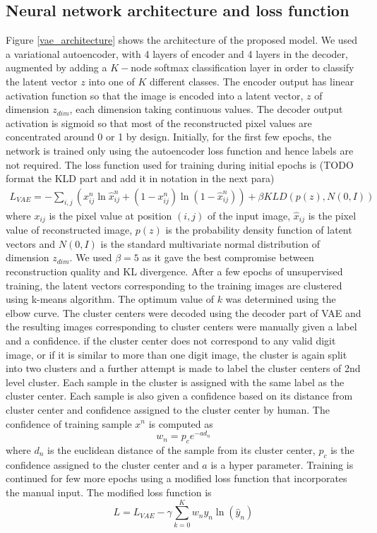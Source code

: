 \documentclass{uai2021} %
\begin{document}
\subsection{Neural network architecture and loss function}
Figure \ref{vae_architecture} shows the architecture of the proposed model.
We used a variational autoencoder\cite{kingma2013auto}, with 4 layers of encoder and 4 layers in the decoder, augmented by adding a $K-$node softmax classification layer in order to classify the latent vector $z$ into one of $K$ different classes.
The encoder output has linear activation function so that the image is encoded into a latent vector, $z$  of dimension $z_{dim}$, each dimension taking continuous values.
The decoder output activation is sigmoid so that most of the reconstructed pixel values  are concentrated around 0 or 1 by design.
Initially, for the first few epochs, the network is trained only using the autoencoder loss function and hence labels are not required.
The loss function used for training during initial epochs is (TODO format the KLD part and add it in notation in the next para)
\begin{multline}
L_{VAE} = -\sum_{i, j}(x_{ij}^n \ln \hat{x}_{ij}^n + (1 - x_{ij}^n) \ln(1 -  \hat{x}_{ij}^n ) )
    +\beta KLD(p(z), N(0,I))
\end{multline}
where   $x_{ij}$ is the pixel value at position $(i, j)$ of the input image, $\hat{x}_{ij}$ is the pixel value of reconstructed image, $p(z)$ is the probability density function of latent vectors and $N(0,I)$ is the standard multivariate normal distribution of dimension $z_{dim}$.
We used $\beta = 5$ as it gave the best compromise between reconstruction quality and KL divergence.
After a few epochs of unsupervised training, the latent vectors corresponding to the training images are clustered using k-means algorithm.
The optimum value of $k$ was determined using the elbow curve. The cluster centers were decoded using the decoder part of VAE and the resulting images corresponding to cluster centers were manually given a label and a confidence.
if the cluster center does not correspond to any valid digit image, or if it is similar to more than one digit image, the cluster is again split into two clusters and a further attempt is made to label the cluster centers of 2nd level cluster.
Each sample in the cluster is assigned with the  same label as the cluster center. Each sample is also given a confidence based on its distance from cluster center and  confidence assigned to the cluster center by human.
The confidence of  training sample $x^n$ is computed as
\begin{equation}
w_n = p_ce^{-a d_n}
\end{equation}
where $d_n$ is the euclidean distance of the sample from its cluster center, $p_c$  is the confidence assigned to the cluster center and $a$ is a hyper parameter.
Training is continued for few more epochs using a modified loss function that incorporates the manual input. The modified loss function is
\begin{equation}
L = L_{VAE}  - \gamma \sum_{k=0}^{K}w_{n}y_{n}\ln(\hat{y}_{n})
\end{equation}
\end{document}
